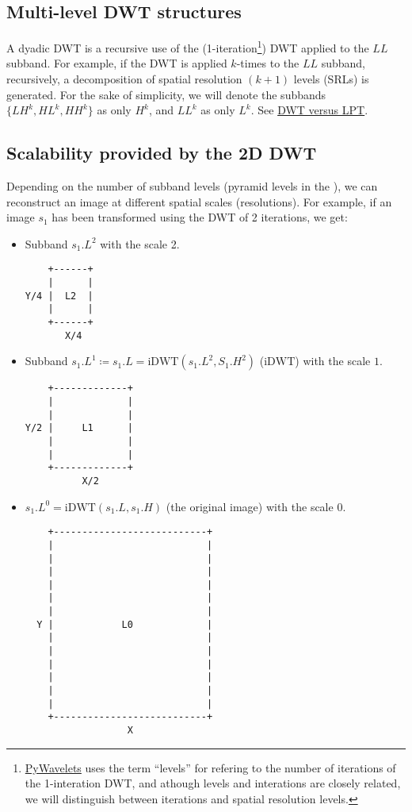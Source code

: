 \subsection{Multi-level DWT structures}
A dyadic DWT is a recursive use of the
(1-iteration\footnote{\href{https://pywavelets.readthedocs.io/en/latest/index.html}{PyWavelets}
  uses the term ``levels'' for refering to the number of iterations of
  the 1-interation DWT, and athough levels and interations are closely
  related, we will distinguish between iterations and spatial
  resolution levels.}) DWT applied to the $LL$ subband. For example,
if the DWT is applied $k$-times to the $LL$ subband, recursively, a
decomposition of spatial resolution $(k+1)$ levels (SRLs) is generated. For
the sake of simplicity, we will denote the subbands $\{LH^k, HL^k,
HH^k\}$ as only $H^k$, and $LL^k$ as only $L^k$. See
\href{https://nbviewer.jupyter.org/github/Sistemas-Multimedia/MCOLP/blob/master/docs/DWT_vs_LPT.ipynb}{DWT
  versus LPT}.

\subsection{Scalability provided by the 2D DWT}
Depending on the number of subband levels (pyramid levels in the
), we can
reconstruct an image at different spatial scales (resolutions). For
example, if an image $s_1$ has been transformed using the DWT of 2
iterations, we get:
\begin{itemize}
\item Subband $s_1.L^2$ with the scale 2.
\begin{verbatim}
    +------+
    |      |
Y/4 |  L2  |
    |      |
    +------+
       X/4
\end{verbatim}
\item Subband $s_1.L^1\coloneqq s_1.L=\text{iDWT}(s_1.L^2, S_1.H^2)$
  ($\text{iDWT}$) with the scale $1$.
\begin{verbatim}
    +-------------+
    |             |
    |             |
Y/2 |     L1      |
    |             | 
    |             |
    +-------------+
          X/2
\end{verbatim}
  
\item $s_1.L^0=\text{iDWT}(s_1.L, s_1.H)$ (the original image) with
  the scale $0$.
\begin{verbatim}
    +---------------------------+
    |                           |
    |                           |
    |                           | 
    |                           |
    |                           |
    |                           |
  Y |            L0             |
    |                           | 
    |                           |
    |                           | 
    |                           | 
    |                           |
    |                           |
    +---------------------------+
                  X
\end{verbatim}
\end{itemize}

